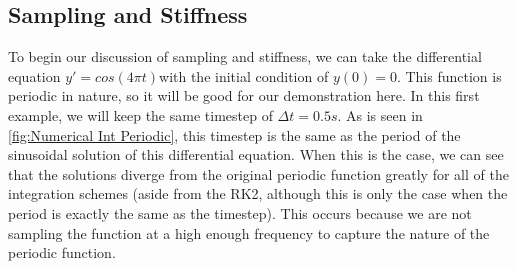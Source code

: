 \documentclass[12pt]{report}
\begin{document}
\subsection{Sampling and Stiffness}\label{sampling and stiffness}
 To begin our discussion of sampling and stiffness, we can take the differential equation $y'=cos(4\pi t)$with the initial condition of $y(0)=0$. This function is periodic in nature, so it will be good for our demonstration here. In this first example, we will keep the same timestep of $\Delta t=0.5s$. As is seen in \ref{fig:Numerical Int Periodic}, this timestep is the same as the period of the sinusoidal solution of this differential equation. When this is the case, we can see that the solutions diverge from the original periodic function greatly for all of the integration schemes (aside from the RK2, although this is only the case when the period is exactly the same as the timestep). This occurs because we are not sampling the function at a high enough frequency to capture the nature of the periodic function.
\end{document}
